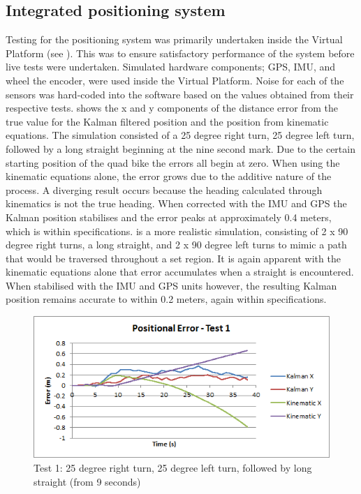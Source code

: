 \documentclass[main.tex]{subfiles}
\begin{document}
\subsection{Integrated positioning system}
Testing for the positioning system was primarily undertaken inside the Virtual Platform (see ). This was to ensure satisfactory performance of the system before live tests were undertaken. Simulated hardware components; GPS, IMU, and wheel the encoder, were used inside the Virtual Platform. Noise for each of the sensors was hard-coded into the software based on the values obtained from their respective tests.
 shows the x and y components of the distance error from the true value for the Kalman filtered position and the position from kinematic equations. The simulation consisted of a 25 degree right turn, 25 degree left turn, followed by a long straight beginning at the nine second mark. Due to the certain starting position of the quad bike the errors all begin at zero. When using the kinematic equations alone, the error grows due to the additive nature of the process. A diverging result occurs because the heading calculated through kinematics is not the true heading. When corrected with the IMU and GPS the Kalman position stabilises and the error peaks at approximately 0.4 meters, which is within specifications.  is a more realistic simulation, consisting of 2 x 90 degree right turns, a long straight, and 2 x 90 degree left turns to mimic a path that would be traversed throughout a set region. It is again apparent with the kinematic equations alone that error accumulates when a straight is encountered. When stabilised with the IMU and GPS units however, the resulting Kalman position remains accurate to within 0.2 meters, again within specifications.
\begin{figure}[ht]
\includegraphics[width=\textwidth]{5-Testing/position_error_test_1.png}
\centering
\caption{Test 1: 25 degree right turn, 25 degree left turn, followed by long straight (from 9 seconds)}
\end{figure}
\end{document}
